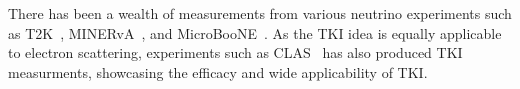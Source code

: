 There has been a wealth of measurements from various neutrino experiments such as  T2K~\cite{T2K:2018rnz, T2K:2021naz}, MINERvA~\cite{MINERvA:2018hba, MINERvA:2019ope, MINERvA:2020anu, MINERvA:2021csy}, and MicroBooNE~\cite{MicroBooNE:2022emb, MicroBooNE:2023cmw, MicroBooNE:2023tzj, MicroBooNE:2023wzy, MicroBooNE:2024tmp}.
As the TKI idea is equally applicable to electron scattering, experiments such as CLAS~\cite{CLAS:2021neh} has also produced TKI measurments, showcasing the efficacy and wide applicability of TKI. 
